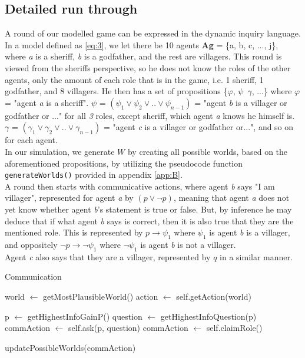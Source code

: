 \subsection{Detailed run through}\label{ARoundOfTheGame}
A round of our modelled game can be expressed in the dynamic inquiry language.
In a model defined as \cref{eq:3}, we let there be 10 agents \textbf{Ag} = \{a,
b, c, ..., j\}, where \textit{a} is a sheriff, \textit{b} is a godfather, and
the rest are villagers. This round is viewed from the sheriffs perspective, so
he does not know the roles of the other agents, only the amount of each role
that is in the game, i.e. 1 sheriff, 1 godfather, and 8 villagers. He then has
a set of propositions \{$\varphi$, $\psi$\, $\gamma$, ...\} where $\varphi$ =
"agent \textit{a} is a sheriff". $\psi$ = $(\psi_1 \lor \psi_2 \lor .. \lor
	\psi_{n-1})$ = "agent \textit{b} is a villager or godfather or ..." for all
\textit{3} roles, except sheriff, which agent \textit{a} knows he himself is.
$\gamma$ = $(\gamma_1 \lor \gamma_2 \lor .. \lor \gamma_{n-1}) $ = "agent
\textit{c} is a villager or godfather or...", and so on for each agent. \\ In
our simulation, we generate $W$ by creating all possible worlds, based on the
aforementioned propositions, by utilizing the pseudocode function
\lstinline{generateWorlds()} provided in appendix \ref{app:B}. \\ A round then
starts with communicative actions, where agent \textit{b} says "I am villager",
represented for agent \textit{a} by $(p \lor \neg p)$, meaning that agent
\textit{a} does not yet know whether agent \textit{b}'s statement is true or
false. But, by inference he may deduce that if what agent \textit{b} says is
correct, then it is also true that they are the mentioned role. This is
represented by $p \rightarrow \psi_1$ where $\psi_1$ is agent \textit{b} is a
villager, and oppositely $\neg p \rightarrow \neg \psi_1$ where $\neg \psi_1$
is agent \textit{b} is not a villager. \\ Agent \textit{c} also says that they
are a villager, represented by $q$ in a similar manner.

\begin{algorithm}
	\caption{Communication}
	\begin{algorithmic}[1]
		\State world $\gets$ getMostPlausibleWorld()
		\State action $\gets$ self.getAction(world)

		\State p $\gets$ getHighestInfoGainP()
		\State question $\gets$ getHighestInfoQuestion(p)
		\State commAction $\gets$ self.ask(p, question)
		\State commAction $\gets$ self.claimRole()
		\EndIf

		\State updatePossibleWorlds(commAction)
		\EndFunction
	\end{algorithmic}
\end{algorithm}\label{lst:communicate}

